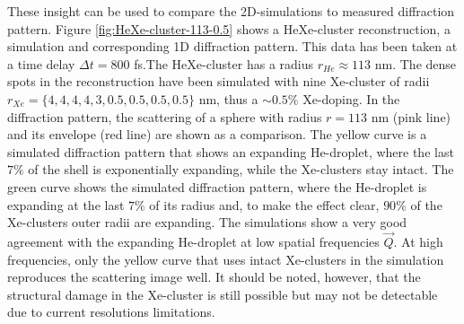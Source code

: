 These insight can be used to compare the 2D-simulations to measured diffraction pattern. Figure \ref{fig:HeXe-cluster-113-0.5} shows a HeXe-cluster reconstruction, a simulation and corresponding 1D diffraction pattern. This data has been taken at a time delay $\Delta t=800$ fs.The HeXe-cluster has a radius $r_{He}\approx 113$ nm. The dense spots in the reconstruction have been simulated with nine Xe-cluster of radii $r_{Xe}=\{4, 4, 4, 4, 3, 0.5, 0.5, 0.5, 0.5\}$ nm, thus a $\sim 0.5 \%$ Xe-doping. In the diffraction pattern, the scattering of a sphere with radius $r=113$ nm (pink line) and its envelope (red line) are shown as a comparison. The yellow curve is a simulated diffraction pattern that shows an expanding He-droplet, where the last $7 \%$ of the shell is exponentially expanding, while the Xe-clusters stay intact. The green curve shows the simulated diffraction pattern, where the He-droplet is expanding at the last $7 \%$ of its radius and, to make the effect clear, $90 \%$ of the Xe-clusters outer radii are expanding. The simulations show a very good agreement with the expanding He-droplet at low spatial frequencies $\vec{Q}$. At high frequencies, only the yellow curve that uses intact Xe-clusters in the simulation reproduces the scattering image well. It should be noted, however, that the structural damage in the Xe-cluster is still possible but may not be detectable due to current resolutions limitations.
%
%
%
